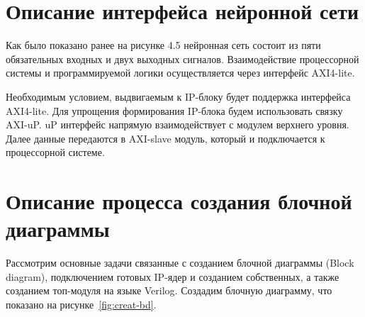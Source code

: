 \section{Описание интерфейса нейронной сети}

\hspace*{12.5 mm}Как было показано ранее на рисунке 4.5 нейронная сеть состоит
из пяти обязательных входных и двух выходных сигналов. 
Взаимодействие процессорной системы и программируемой логики 
осуществляется через интерфейс AXI4-lite. 

Необходимым условием, выдвигаемым к IP-блоку будет поддержка 
интерфейса AXI4-lite. Для упрощения формирования IP-блока 
будем использовать связку AXI-uP. uP интерфейс напрямую 
взаимодействует с модулем верхнего уровня. Далее данные 
передаются в AXI-slave модуль, который и подключается к 
процессорной системе.

\section{Описание процесса создания блочной диаграммы}
\hspace*{12.5 mm}Рассмотрим основные задачи связанные с созданием блочной 
диаграммы (Block diagram), подключением готовых IP-ядер и созданием собственных, 
а также созданием топ-модуля на языке Verilog. Создадим блочную диаграмму, что 
показано на рисунке~\ref{fig:creat-bd}.





